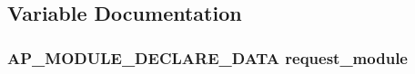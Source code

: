 \subsection{Variable Documentation}
\subsubsection[{\texorpdfstring{request\+\_\+module}{request_module}}]{ {\bf A\+P\+\_\+\+M\+O\+D\+U\+L\+E\+\_\+\+D\+E\+C\+L\+A\+R\+E\+\_\+\+D\+A\+TA} request\+\_\+module}\hypertarget{group__MOD__REQUEST_ga9cfd2b3b748e96215ef549fe178a52a9}{}\label{group__MOD__REQUEST_ga9cfd2b3b748e96215ef549fe178a52a9}
